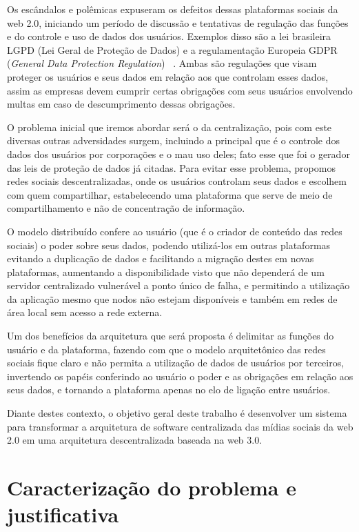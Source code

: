 Os escândalos e polêmicas expuseram os defeitos dessas plataformas sociais da web 2.0, iniciando um período de discussão e tentativas de regulação das funções e do controle e uso de dados dos usuários.
Exemplos disso são a lei brasileira LGPD (Lei Geral de Proteção de Dados) e a regulamentação Europeia GDPR (\textit{General Data Protection Regulation})~\cite{LGPD1} \cite{GPDR1}.
Ambas são regulações que visam proteger os usuários e seus dados em relação aos que controlam esses dados, assim as empresas devem cumprir certas obrigações com seus usuários envolvendo multas em caso de descumprimento dessas obrigações.

O problema inicial que iremos abordar será o da centralização, pois com este diversas outras adversidades surgem, incluindo a principal que é o controle dos dados dos usuários por corporações e o mau uso deles; fato esse que foi o gerador das leis de proteção de dados já citadas.
Para evitar esse problema, propomos redes sociais descentralizadas, onde os usuários controlam seus dados e escolhem com quem compartilhar, estabelecendo uma plataforma que serve de meio de compartilhamento e não de concentração de informação.

O modelo distribuído confere ao usuário (que é o criador de conteúdo das redes sociais) o poder sobre seus dados, podendo utilizá-los em outras plataformas evitando a duplicação de dados e facilitando a migração destes em novas plataformas, aumentando a disponibilidade visto que não dependerá de um servidor centralizado vulnerável a  ponto único de falha, e permitindo a utilização da aplicação mesmo que nodos não estejam disponíveis e também em redes de área local sem acesso a rede externa.

Um dos benefícios da arquitetura que será proposta é delimitar as funções do usuário e da plataforma, fazendo com que o modelo arquitetônico das redes sociais fique claro e não permita a utilização de dados de usuários por terceiros, invertendo os papéis conferindo ao usuário o poder e as obrigações em relação aos seus dados, e tornando a plataforma apenas no elo de ligação entre usuários.

Diante destes contexto, o objetivo geral deste trabalho é desenvolver um sistema para transformar a arquitetura de software centralizada das mídias sociais da web 2.0 em uma arquitetura descentralizada baseada na web 3.0.


\chapter{Caracterização do problema e justificativa}

